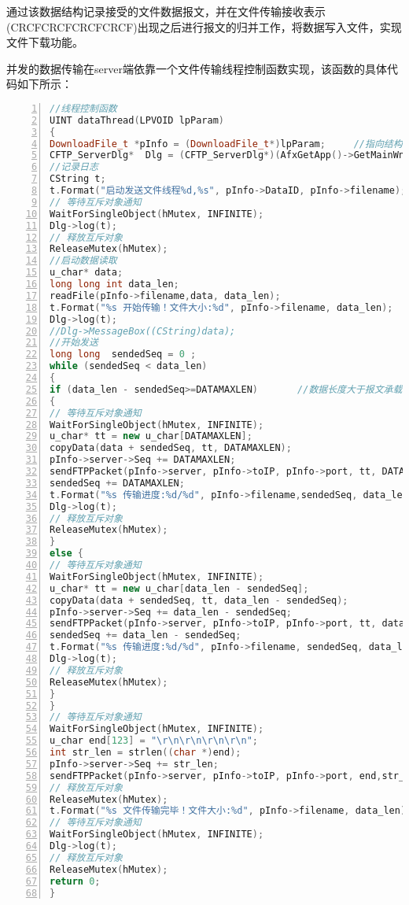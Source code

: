\documentclass[lang=cn,11pt]{elegantpaper}
\begin{document}
通过该数据结构记录接受的文件数据报文，并在文件传输接收表示\text(CRCFCRCFCRCFCRCF)出现之后进行报文的归并工作，将数据写入文件，实现文件下载功能。

并发的数据传输在server端依靠一个文件传输线程控制函数实现，该函数的具体代码如下所示：


\begin{lstlisting}[language = C++, numbers=left, 
numberstyle=\tiny,keywordstyle=\color{blue!70},
commentstyle=\color{red!50!green!50!blue!50},frame=shadowbox,
rulesepcolor=\color{red!20!green!20!blue!20},basicstyle=\ttfamily]
//线程控制函数
UINT dataThread(LPVOID lpParam)
{
DownloadFile_t *pInfo = (DownloadFile_t*)lpParam;     //指向结构体的实例。
CFTP_ServerDlg*  Dlg = (CFTP_ServerDlg*)(AfxGetApp()->GetMainWnd());
//记录日志
CString t;
t.Format("启动发送文件线程%d,%s", pInfo->DataID, pInfo->filename);
// 等待互斥对象通知
WaitForSingleObject(hMutex, INFINITE);
Dlg->log(t);
// 释放互斥对象
ReleaseMutex(hMutex);
//启动数据读取
u_char* data;
long long int data_len;
readFile(pInfo->filename,data, data_len);
t.Format("%s 开始传输！文件大小:%d", pInfo->filename, data_len);
Dlg->log(t);
//Dlg->MessageBox((CString)data);
//开始发送
long long  sendedSeq = 0 ;
while (sendedSeq < data_len)
{
if (data_len - sendedSeq>=DATAMAXLEN)		//数据长度大于报文承载长度
{
// 等待互斥对象通知
WaitForSingleObject(hMutex, INFINITE);
u_char* tt = new u_char[DATAMAXLEN];
copyData(data + sendedSeq, tt, DATAMAXLEN);
pInfo->server->Seq += DATAMAXLEN;
sendFTPPacket(pInfo->server, pInfo->toIP, pInfo->port, tt, DATAMAXLEN,pInfo->server->userID, pInfo->DataID, pInfo->server->Seq, pInfo->server->Ack, ACK);
sendedSeq += DATAMAXLEN;
t.Format("%s 传输进度:%d/%d", pInfo->filename,sendedSeq, data_len);
Dlg->log(t);
// 释放互斥对象
ReleaseMutex(hMutex);
}
else {
// 等待互斥对象通知
WaitForSingleObject(hMutex, INFINITE);
u_char* tt = new u_char[data_len - sendedSeq];
copyData(data + sendedSeq, tt, data_len - sendedSeq);
pInfo->server->Seq += data_len - sendedSeq;
sendFTPPacket(pInfo->server, pInfo->toIP, pInfo->port, tt, data_len - sendedSeq, pInfo->server->userID, pInfo->DataID, pInfo->server->Seq, pInfo->server->Ack, ACK);
sendedSeq += data_len - sendedSeq;
t.Format("%s 传输进度:%d/%d", pInfo->filename, sendedSeq, data_len);
Dlg->log(t);
// 释放互斥对象
ReleaseMutex(hMutex);
}
}
// 等待互斥对象通知
WaitForSingleObject(hMutex, INFINITE);
u_char end[123] = "\r\n\r\n\r\n\r\n";
int str_len = strlen((char *)end);
pInfo->server->Seq += str_len;
sendFTPPacket(pInfo->server, pInfo->toIP, pInfo->port, end,str_len, pInfo->server->userID, pInfo->DataID, pInfo->server->Seq, pInfo->server->Ack, ACK);
// 释放互斥对象
ReleaseMutex(hMutex);
t.Format("%s 文件传输完毕！文件大小:%d", pInfo->filename, data_len);
// 等待互斥对象通知
WaitForSingleObject(hMutex, INFINITE);
Dlg->log(t);
// 释放互斥对象
ReleaseMutex(hMutex);
return 0;
}
\end{lstlisting}
\end{document}
